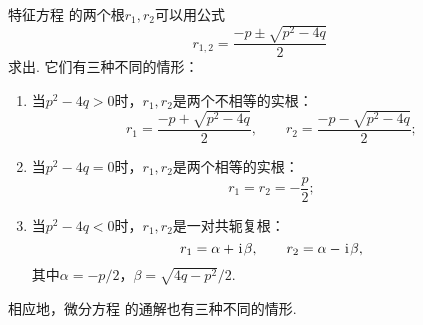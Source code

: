 特征方程  的两个根\(r_1,r_2\)可以用公式\[
r_{1,2} = \frac{-p \pm\sqrt{p^2-4q}}{2}
\]求出.
它们有三种不同的情形：\begin{enumerate}
	\item 当\(p^2-4q>0\)时，\(r_1,r_2\)是两个不相等的实根：\[
		r_1 = \frac{-p +\sqrt{p^2-4q}}{2}, \qquad
		r_2 = \frac{-p -\sqrt{p^2-4q}}{2};
	\]
	\item 当\(p^2-4q=0\)时，\(r_1,r_2\)是两个相等的实根：\[
		r_1 = r_2 = -\frac{p}{2};
	\]
	\item 当\(p^2-4q<0\)时，\(r_1,r_2\)是一对共轭复根：\[
		r_1 = \alpha+\kern1pt\mathrm{i}\kern1pt\beta, \qquad r_2 = \alpha-\kern1pt\mathrm{i}\kern1pt\beta,
	\]
	其中\(\alpha=-p/2\)，\(\beta=\sqrt{4q-p^2}/2\).
\end{enumerate}

相应地，微分方程  的通解也有三种不同的情形.
